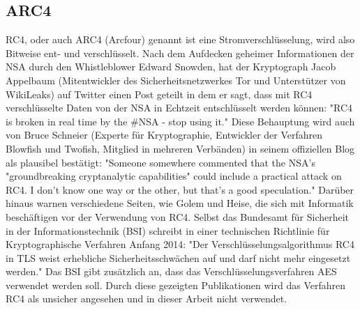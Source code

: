 \documentclass[10pt, a4paper]{scrreprt}
\begin{document}
\subsection{ARC4}
RC4, oder auch ARC4 (Arcfour) genannt ist eine Stromverschlüsselung, wird also Bitweise ent- und verschlüsselt. %
Nach dem Aufdecken geheimer Informationen der NSA durch den Whistleblower Edward Snowden, hat der Kryptograph Jacob Appelbaum (Mitentwickler des Sicherheitsnetzwerkes Tor und Unterstützer von WikiLeaks) auf Twitter einen Post geteilt in dem er sagt, dass mit RC4 verschlüsselte Daten von der NSA in Echtzeit entschlüsselt werden können: "RC4 is broken in real time by the \#NSA - stop using it." %
Diese Behauptung wird auch von Bruce Schneier (Experte für Kryptographie, Entwickler der Verfahren Blowfish und Twofish, Mitglied in mehreren Verbänden) in seinem offiziellen Blog als plausibel bestätigt: "Someone somewhere commented that the NSA's "groundbreaking cryptanalytic capabilities" could include a practical attack on RC4. I don't know one way or the other, but that's a good speculation." %
Darüber hinaus warnen verschiedene Seiten, wie Golem und Heise, die sich mit Informatik beschäftigen vor der Verwendung von RC4. %
Selbst das Bundesamt für Sicherheit in der Informationstechnik (BSI) schreibt in einer technischen Richtlinie für Kryptographische Verfahren Anfang 2014: "Der Verschlüsselungsalgorithmus RC4 in TLS weist erhebliche Sicherheitsschwächen auf und darf nicht mehr eingesetzt werden." Das BSI gibt zusätzlich an, dass das Verschlüsselungsverfahren AES verwendet werden soll. %
Durch diese gezeigten Publikationen wird das Verfahren RC4 als unsicher angesehen und in dieser Arbeit nicht verwendet.
\end{document}
